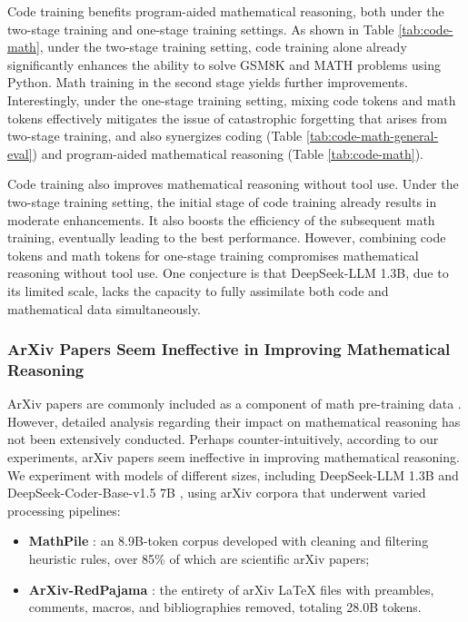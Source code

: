 Code training benefits program-aided mathematical reasoning, both under the two-stage training and one-stage training settings. As shown in Table \ref{tab:code-math}, under the two-stage training setting, code training alone already significantly enhances the ability to solve GSM8K and MATH problems using Python. Math training in the second stage yields further improvements. Interestingly, under the one-stage training setting, mixing code tokens and math tokens effectively mitigates the issue of catastrophic forgetting that arises from two-stage training, and also synergizes coding (Table \ref{tab:code-math-general-eval}) and program-aided mathematical reasoning (Table \ref{tab:code-math}).

Code training also improves mathematical reasoning without tool use. Under the two-stage training setting, the initial stage of code training already results in moderate enhancements. It also boosts the efficiency of the subsequent math training, eventually leading to the best performance. However, combining code tokens and math tokens for one-stage training compromises mathematical reasoning without tool use. One conjecture is that DeepSeek-LLM 1.3B, due to its limited scale, lacks the capacity to fully assimilate both code and mathematical data simultaneously.

\subsubsection{ArXiv Papers Seem Ineffective in Improving Mathematical Reasoning}

ArXiv papers are commonly included as a component of math pre-training data \citep{minerva,gpt-f,llemma,mathpile}. However, detailed analysis regarding their impact on mathematical reasoning has not been extensively conducted. Perhaps counter-intuitively, according to our experiments, arXiv papers seem ineffective in improving mathematical reasoning. We experiment with models of different sizes, including DeepSeek-LLM 1.3B and DeepSeek-Coder-Base-v1.5 7B \citep{deepseek-coder}, using arXiv corpora that underwent varied processing pipelines:

\begin{itemize}[topsep=0pt]
    \item \textbf{MathPile} \citep{mathpile}: an 8.9B-token corpus developed with cleaning and filtering heuristic rules, over 85\% of which are scientific arXiv papers;
    \item \textbf{ArXiv-RedPajama} \citep{redpajama}: the entirety of arXiv LaTeX files with preambles, comments, macros, and bibliographies removed, totaling 28.0B tokens.
\end{itemize}

